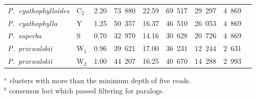 \documentclass[12pt,letterpaper]{article}
\begin{document}
\begin{sidewaystable}
\begin{center}
\begin{tabular*}{1.0\textwidth}{@{\extracolsep{\fill}}llccccccc}
\emph{P.~cyathophylloides}                        &C$_2$      &2.20   & 73~880   &22.59   &69~517  &29~297   &  4~869 \\  %
\emph{P.~cyathophylla}                            &Y         &1.25    & 50~357   &16.37   &46~510  &26~053   &  4~869 \\  %
\emph{P.~superba}                                 &S         &0.70    & 32~970   &14.16    &30~628  &20~726   &  4~869 \\  %
\emph{P.~przewalskii}                             &W$_1$     &0.96    & 39~621   &17.00    &36~231  &12~244   &  2~631 \\  %
\emph{P.~przewalskii}                             &W$_2$      &1.00   & 44~207   &16.25    &40~670  &14~288   &  2~993 \\  %
\hline
\hline
\end{tabular*}
\bigskip
\end{center}
\noindent $^{a}$ clusters with more than the minimum depth of five reads.\\
\noindent $^{b}$ consensus loci which passed filtering for paralogs.
\end{sidewaystable}

\clearpage
\newpage
\end{document}

